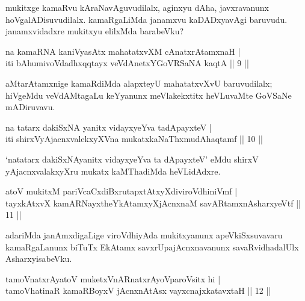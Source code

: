 \begin{artha}
mukitxge kamaRvu kAraNavAguvudilalx, aginxyu dAha, javxravanunx 
hoVgalADi\-suvudilalx. kamaRgaLiMda janamxvu kaDADxyavAgi baruvudu. 
janamxvidadxre mukitxyu elilxMda barabeVku?
\end{artha}


\begin{shl}
na kamaRNA kaniVyasAtx mahatatxvXM cAnatxrAtamxnaH | \\
iti bAhumivoVdadhxqqtayx veVdAnetxYGoVRSaNA kaqtA \hfill|| 9  || 
\end{shl}

\begin{artha}
aMtarAtamxnige kamaRdiMda alapxteyU mahatatxvXvU baruvudilalx; hiVgeMdu veVdAMtagaLu keYyanunx meVlakekxtitx heVLuvaMte GoVSaNe mADiruvavu.
\end{artha}


\begin{shl}
na tatarx dakiSxNA yanitx vidayxyeYva tadApayxteV | \\
iti shirxVyAjacnxvalekxyXVna mukatxkaNaThxmudAhaqtamf \hfill || 10 || 
\end{shl}

\begin{artha}
`natatarx dakiSxNAyanitx vidayxyeYva ta dApayxteV' eMdu shirxV yAjacnxvalakxyXru mukatx kaMThadiMda heVLidAdxre.
\end{artha}

\begin{shl}
atoV mukitxM pariVcaCxdiBxrutapxtAtxyXdiviroVdhiniVmf | \\
tayxkAtxvX kamARNayxtheYkAtamxyXjAcnxnaM savARtamxnA\s \s sharxyeVtf \hfill|| 11 || 
\end{shl}

\begin{artha}
adariMda janAmxdigaLige viroVdhiyAda mukitxyanunx apeVkiSxsuvavaru 
kamaRgaLanunx biTuTx EkAtamx savxrUpajAcnxnavanunx savaRvidhadalUlx 
AsharxyisabeVku.
\end{artha}


\begin{shl}
tamoVnatxrAyatoV muketxVnARnatxrAyoV\s paroV\s sitx hi | \\
tamoVhatinaR kamaRBoyxV jAcnxnAtAsx vayxcnajxkatavxtaH \hfill|| 12 || 
\end{shl}

